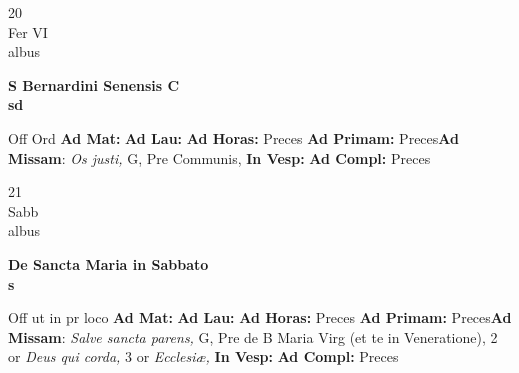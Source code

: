\documentclass[10pt, openany]{book}
\begin{document}
    \begin{center}
        \begin{minipage}{3.5in}
            \vspace{2em}
            \begin{minipage}{0.5in}
                {\Huge 20} \\
                {\normalsize Fer VI} \\
                {\normalsize albus}
            \end{minipage}
            \begin{minipage}{3.0in}
                \textbf{ \large S Bernardini Senensis C \\
                \textnormal{\normalsize sd}} \\ 
            \end{minipage}
            \begin{justify}Off Ord
                \textbf{Ad Mat: }
                \textbf{Ad Lau: }
                \textbf{Ad Horas: }Preces
                \textbf{Ad Primam: }Preces\textbf{Ad Missam}: \textit{Os justi,} G, Pre Communis,  
                \textbf{In Vesp: }
                \textbf{Ad Compl: }Preces
            \end{justify}
        \end{minipage}
    \end{center}

    \begin{center}
        \begin{minipage}{3.5in}
            \vspace{2em}
            \begin{minipage}{0.5in}
                {\Huge 21} \\
                {\normalsize Sabb} \\
                {\normalsize albus}
            \end{minipage}
            \begin{minipage}{3.0in}
                \textbf{ \large De Sancta Maria in Sabbato \\
                \textnormal{\normalsize s}} \\ 
            \end{minipage}
            \begin{justify}Off ut in pr loco
                \textbf{Ad Mat: }
                \textbf{Ad Lau: }
                \textbf{Ad Horas: }Preces
                \textbf{Ad Primam: }Preces\textbf{Ad Missam}: \textit{Salve sancta parens,} G, Pre de B Maria Virg (et te in Veneratione), 2 or \textit{Deus qui corda,} 3 or \textit{Ecclesiæ,}  
                \textbf{In Vesp: }
                \textbf{Ad Compl: }Preces
            \end{justify}
        \end{minipage}
    \end{center}
\end{document}
